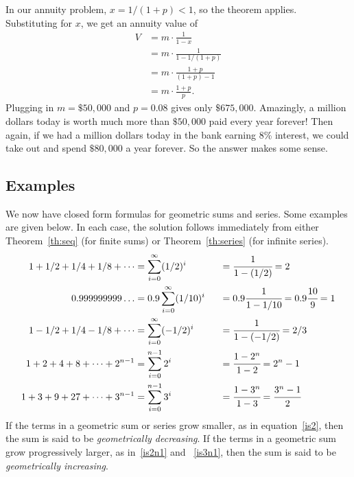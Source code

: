 In our annuity problem, $x=1/(1+p) < 1$, so the theorem applies.
Substituting for $x$, we get an annuity value of
\begin{align*}
V &= m\cdot\frac{1}{1-x} \\
&= m\cdot \frac{1}{1-1/(1+p)}\\
&= m\cdot \frac{1+p}{(1+p)-1}\\
&= m\cdot \frac{1 + p}{p}.
\end{align*}
Plugging in $m = \$50,000$ and $p = 0.08$ gives only $\$675,000$.
Amazingly, a million dollars today is worth much more than $\$50,000$
paid every year forever!  Then again, if we had a million dollars
today in the bank earning 8\% interest, we could take out and spend
$\$80,000$ a year forever.  So the answer makes some sense.


\subsection{Examples}

We now have closed form formulas for geometric sums and series.  Some
examples are given below.  In each case, the solution follows immediately
from either Theorem~\ref{th:seq} (for finite sums) or
Theorem~\ref{th:series} (for infinite series).
\begin{alignat}{3}
1 + 1/2 + 1/4 + 1/8 + \cdots &=\sum_{i=0}^\infty (1/2)^i
                             &\;\;&=\cfrac{1}{1-(1/2)}
                               =2 \label{is2}
\\
0.999999999\dots             &=0.9 \sum_{i=0}^{\infty} (1/10)^i
                             &&=0.9\cfrac{1}{1-1/10}
                               =0.9\cfrac{10}{9} 
                               =1 \label{is1}
\\
1 - 1/2 + 1/4 - 1/8 + \cdots &=\sum_{i=0}^\infty (-1/2)^i
                             &&=\cfrac{1}{1-(-1/2)}
                               =2/3 \label{is23}
\\
1 + 2 + 4 + 8 + \cdots + 2^{n-1} &=\sum_{i=0}^{n-1} 2^i
                                 &&=\cfrac{1 - 2^n}{1 - 2}
                                   =2^n - 1 \label{is2n1}
\\
1 + 3 + 9 + 27 + \cdots + 3^{n-1} &=\sum_{i=0}^{n-1} 3^i
                                  &&=\cfrac{1 - 3^n}{1 - 3}
                                    =\cfrac{3^n - 1}{2} \label{is3n1}
\end{alignat}
If the terms in a geometric sum or series grow smaller, as in
equation~\eqref{is2}, then the sum is said to be {\em geometrically
decreasing}.  If the terms in a geometric sum grow progressively larger,
as in~\eqref{is2n1} and ~\eqref{is3n1}, then the sum is said to be {\em
geometrically increasing}.

